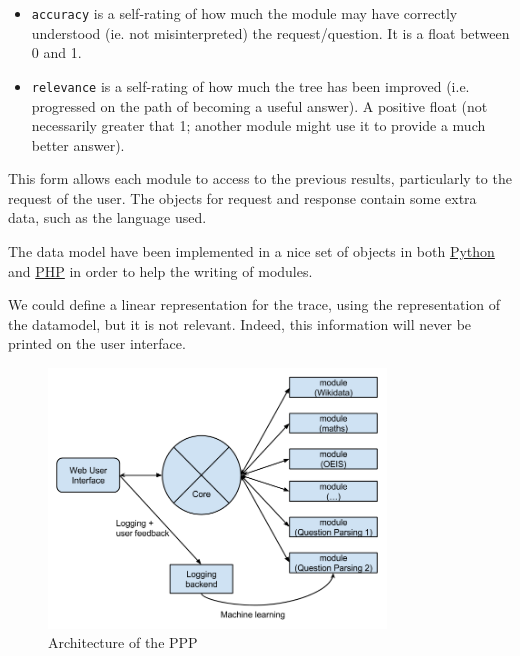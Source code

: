 \begin{itemize}
    \item \texttt{accuracy} is a self-rating of how much the module may have correctly understood (ie. not misinterpreted) the request/question. It is a float between 0 and 1.
    \item \texttt{relevance} is a self-rating of how much the tree has been improved (i.e. progressed on the path of becoming a useful answer). A positive float (not necessarily greater that 1; another module might use it to provide a much better answer).
\end{itemize}

This form allows each module to access to the previous results, particularly to the request of the user. The objects for request and response contain some extra data, such as the language used.

The data model have been implemented in a nice set of objects in both \href{http://github.com/ProjetPP/PPP-datamodel-Python}{Python} and \href{http://github.com/ProjetPP/PPP-datamodel-PHP}{PHP} in order to help the writing of modules.

We could define a linear representation for the trace, using the representation of the datamodel, but it is not relevant. Indeed, this information will never be printed on the user interface.

\begin{figure}[!ht]
  \centering
    \label{datamodel:struct}
    \caption{Architecture of the PPP}
    \includegraphics[width=0.8\textwidth]{../ppp_structure.png}
\end{figure}
